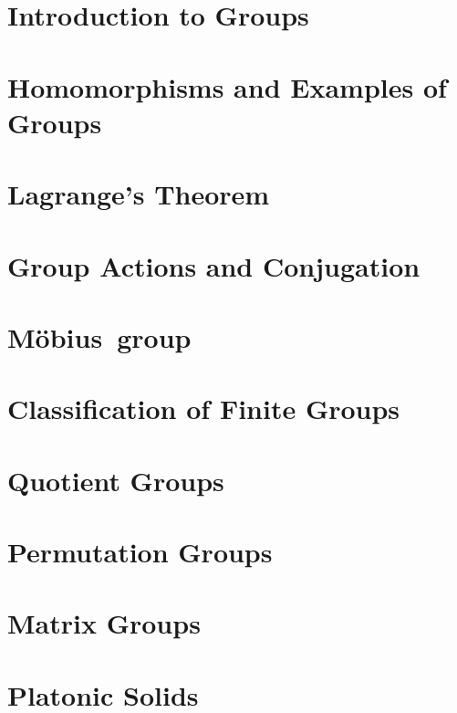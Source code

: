 \documentclass[british,11pt,a4paper]{report}
\newcommand{\Mobius}{M\"obius}
\begin{document}
\maketitle
\tableofcontents
\chapter{Introduction to Groups} %

\chapter{Homomorphisms and Examples of Groups} %

\chapter{Lagrange's Theorem} %

\chapter{Group Actions and Conjugation} %

\chapter{\Mobius~group} %

\chapter{Classification of Finite Groups} %
\chapter{Quotient Groups} %
\chapter{Permutation Groups} %

\chapter{Matrix Groups}

\chapter{Platonic Solids}

\end{document}
